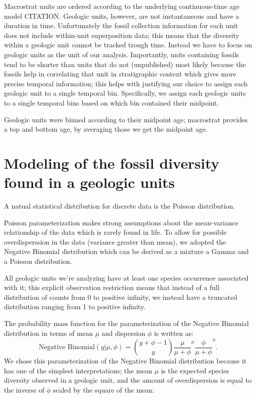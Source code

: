 \documentclass[12pt,letterpaper]{article}
\begin{document}
Macrostrat units are ordered according to the underlying continuous-time age model CITATION. Geologic units, however, are not instantaneous and have a duration in time. Unfortunately the fossil collection information for each unit does not include within-unit superposition data; this means that the diversity within a geologic unit cannot be tracked trough time. Instead we have to focus on geologic units as the unit of our analysis. Importantly, units containing fossils tend to be shorter than units that do not (unpublished) most likely because the fossils help in correlating that unit in stratigraphic context which gives more precise temporal information; this helps with justifying our choice to assign each geologic unit to a single temporal bin. Specifically, we assign each geologic units to a single temporal bins based on which bin contained their midpoint. 



Geologic units were binned according to their midpoint age; macrostrat provides a top and bottom age, by averaging those we get the midpoint age.






\section{Modeling of the fossil diversity found in a geologic units}

A natual statistical distribution for discrete data is the Poisson distribution. 

Poisson parameterization makes strong assumptions about the mean-variance relationship of the data which is rarely found in life. To allow for possible overdisperssion in the data (variance greater than mean), we adopted the Negative Binomial distribution which can be derived as a mixture a Gamma and a Poisson distribution.

All geologic units we're analyzing have at least one species occurrence associated with it; this explicit observation restriction means that instead of a full distribution of counts from 0 to positive infinity, we instead have a truncated distribution ranging from 1 to positive infinity.


The probability mass function for the parameterization of the Negative Binomial distribution in terms of mean \(\mu\) and dispersion \(\phi\) is written as:
\begin{equation}
  \text{Negative Binomial}(y | \mu, \phi) = \binom{y + \phi - 1}{y} \frac{\mu}{\mu + \phi}^{\mu} \frac{\phi}{\mu + \phi}^{\phi}.
\end{equation}
We chose this parameterization of the Negative Binomial distribution because it has one of the simplest interpretations; the mean \(\mu\) is the expected species diversity observed in a geologic unit, and the amount of overdispersion is equal to the inverse of \(\phi\) scaled by the square of the mean. 
\end{document}
